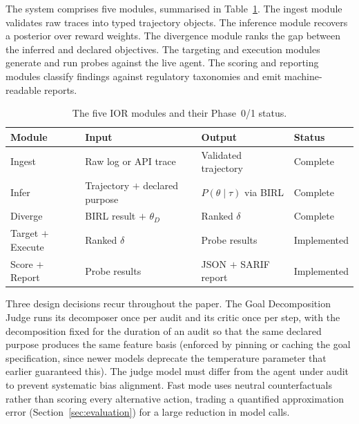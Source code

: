 The system comprises five modules, summarised in Table~\ref{tab:modules}. The
ingest module validates raw traces into typed trajectory objects. The inference
module recovers a posterior over reward weights. The divergence module ranks the
gap between the inferred and declared objectives. The targeting and execution
modules generate and run probes against the live agent. The scoring and reporting
modules classify findings against regulatory taxonomies and emit machine-readable
reports.

\begin{table}[h]
\centering
\small
\begin{tabular}{@{}llll@{}}
\toprule
Module & Input & Output & Status \\
\midrule
Ingest & Raw log or API trace & Validated trajectory & Complete \\
Infer & Trajectory $+$ declared purpose & $P(\theta \mid \tau)$ via BIRL & Complete \\
Diverge & BIRL result $+$ $\theta_D$ & Ranked $\delta$ & Complete \\
Target $+$ Execute & Ranked $\delta$ & Probe results & Implemented \\
Score $+$ Report & Probe results & JSON $+$ SARIF report & Implemented \\
\bottomrule
\end{tabular}
\caption{The five IOR modules and their Phase~0/1 status.}
\label{tab:modules}
\end{table}

Three design decisions recur throughout the paper. The Goal Decomposition Judge
runs its decomposer once per audit and its critic once per step, with the
decomposition fixed for the duration of an audit so that the same declared purpose
produces the same feature basis (enforced by pinning or caching the goal
specification, since newer models deprecate the temperature parameter that earlier
guaranteed this). The judge model must differ from the agent
under audit to prevent systematic bias alignment. Fast mode uses neutral
counterfactuals rather than scoring every alternative action, trading a quantified
approximation error (Section~\ref{sec:evaluation}) for a large reduction in model
calls.

